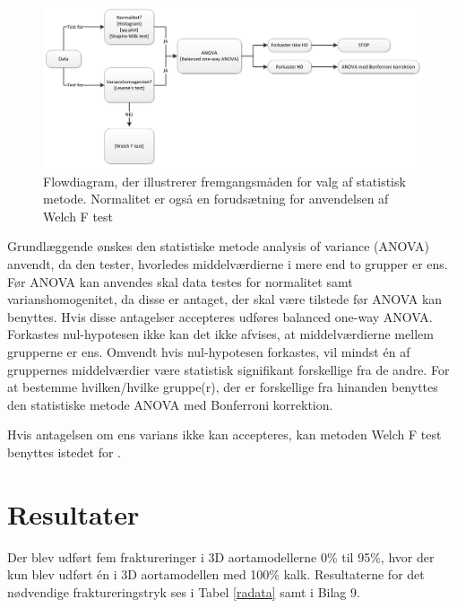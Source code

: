 \begin{figure}[H]
	\centering
	\includegraphics[width=1\textwidth]{Figure/statistiskmetode}
	\caption{Flowdiagram, der illustrerer fremgangsmåden for valg af statistisk metode. Normalitet er også en forudsætning for anvendelsen af Welch F test}
	\label{flow}
\end{figure}  

Grundlæggende ønskes den statistiske metode analysis of variance (ANOVA) anvendt, da den tester, hvorledes middelværdierne i mere end to grupper er ens. Før ANOVA kan anvendes skal data testes for normalitet samt varianshomogenitet, da disse er antaget, der skal være tilstede før ANOVA kan benyttes. Hvis disse antagelser accepteres udføres balanced one-way ANOVA. Forkastes nul-hypotesen ikke kan det ikke afvises, at middelværdierne mellem grupperne er ens. Omvendt hvis nul-hypotesen forkastes, vil mindst én af gruppernes middelværdier være statistisk signifikant forskellige fra de andre. For at bestemme hvilken/hvilke gruppe(r), der er forskellige fra hinanden benyttes den statistiske metode ANOVA med Bonferroni korrektion.

Hvis antagelsen om ens varians ikke kan accepteres, kan metoden Welch F test benyttes istedet for \cite{welchftest}. 
  

\section{Resultater}
Der blev udført fem fraktureringer i 3D aortamodellerne 0\% til 95\%, hvor der kun blev udført én i 3D aortamodellen med 100\% kalk. Resultaterne for det nødvendige fraktureringstryk ses i Tabel \ref{radata} samt i Bilag 9.


